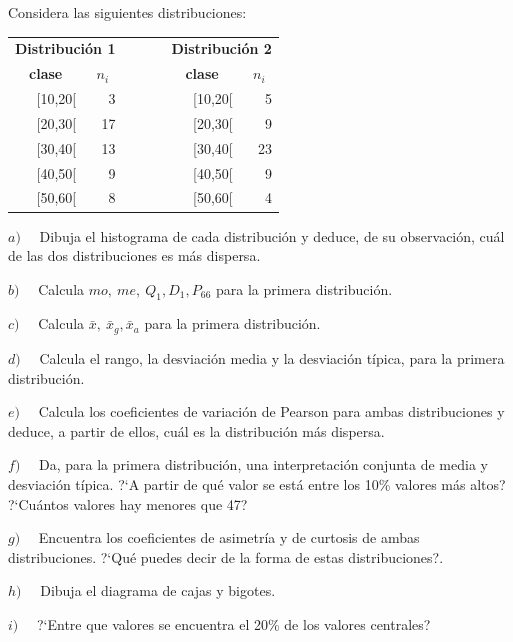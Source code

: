 \begin{ejemplo}
\begin{ejer}
	Considera las siguientes distribuciones:
	
\begin{table}[H]
\centering
\begin{tabular}{|r|r|r|r|r|}
\cline{1-2} \cline{4-5}
\multicolumn{2}{|c|}{\textbf{Distribución 1}} & \multicolumn{1}{c|}{\textbf{}} & \multicolumn{2}{c|}{\textbf{Distribución 2}} \\ \cline{1-2} \cline{4-5} 
\multicolumn{1}{|c|}{\textbf{clase}} & \multicolumn{1}{c|}{\textbf{$n_i$}} & \multicolumn{1}{c|}{\textbf{$\qquad$}} & \multicolumn{1}{c|}{\textbf{clase}} & \multicolumn{1}{c|}{\textbf{$n_i$}} \\ \cline{1-2} \cline{4-5} 
[10,20[ & 3 &  & [10,20[ & 5 \\ \cline{1-2} \cline{4-5} 
[20,30[ & 17 &  & [20,30[ & 9 \\ \cline{1-2} \cline{4-5} 
[30,40[ & 13 &  & [30,40[ & 23 \\ \cline{1-2} \cline{4-5} 
[40,50[ & 9 &  & [40,50[ & 9 \\ \cline{1-2} \cline{4-5} 
[50,60[ & 8 &  & [50,60[ & 4 \\ \cline{1-2} \cline{4-5} 
\end{tabular}
\end{table}	
\end{ejer}

$a)\quad$ Dibuja el histograma de cada distribución y deduce, de su observación, cuál de las dos distribuciones es más dispersa.

$b)\quad$ Calcula $mo, \ me, \ Q_1, D_1, P_{66}$ para la primera distribución.

$c)\quad$ Calcula $\bar x,\ \bar x_g, \bar x_a$ para la primera distribución.

$d)\quad$ Calcula el rango, la desviación media y la desviación típica, para la primera distribución.

$e)\quad$ Calcula los coeficientes de variación de Pearson para ambas distribuciones y deduce, a partir de ellos, cuál es la distribución más dispersa.

$f)\quad$ Da, para la primera distribución, una interpretación conjunta de media y desviación típica. ?`A partir de qué valor se está entre los 10\% valores más altos? ?`Cuántos valores hay menores que 47? 

$g)\quad$ Encuentra los coeficientes de asimetría y de curtosis de ambas distribuciones. ?`Qué puedes decir de la forma de estas distribuciones?.

$h)\quad$ Dibuja el diagrama de cajas y bigotes.

$i)\quad$ ?`Entre que valores se encuentra el 20\% de los valores centrales?

\end{ejemplo}

